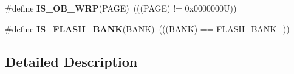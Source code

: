 \begin{DoxyCompactItemize}
$$\item 
\mbox{\label{group___f_l_a_s_h_ex___private___macros_ga0833946dba77c6e2537b4afe94c2bfe1}} 
\#define {\bfseries I\+S\+\_\+\+O\+B\+\_\+\+W\+RP}(P\+A\+GE)~(((P\+A\+GE) != 0x0000000\+U))
\item 
\mbox{\label{group___f_l_a_s_h_ex___private___macros_ga13845f67e09ef81901c6fa683f13f086}} 
\#define {\bfseries I\+S\+\_\+\+F\+L\+A\+S\+H\+\_\+\+B\+A\+NK}(B\+A\+NK)~(((B\+A\+NK) == \hyperlink{group___f_l_a_s_h_ex___banks_ga8ac3f24496e5de6a2f6bd3ff77f0ca53}{F\+L\+A\+S\+H\+\_\+\+B\+A\+N\+K\+\_}))
\end{DoxyCompactItemize}


\subsection{Detailed Description}

